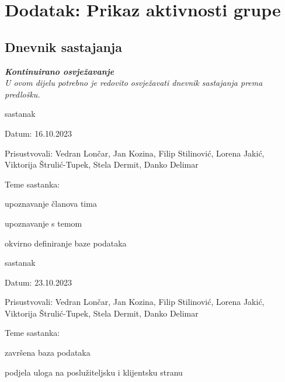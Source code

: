 \chapter*{Dodatak: Prikaz aktivnosti grupe}
		
		\section*{Dnevnik sastajanja}
		
		\textbf{\textit{Kontinuirano osvježavanje}}\\
		
		 \textit{U ovom dijelu potrebno je redovito osvježavati dnevnik sastajanja prema predlošku.}
		
		\begin{packed_enum}
			\item  sastanak
			
			\item[] \begin{packed_item}
				\item Datum: 16.10.2023
				\item Prisustvovali: Vedran Lončar, Jan Kozina, Filip Stilinović, Lorena Jakić, Viktorija Štrulić-Tupek, Stela Dermit, Danko Delimar
				\item Teme sastanka:
				\begin{packed_item}
					\item  upoznavanje članova tima
					\item  upoznavanje s temom
					\item  okvirno definiranje baze podataka
				\end{packed_item}
			\end{packed_item}
			
			\item  sastanak
			\item[] \begin{packed_item}
				\item Datum: 23.10.2023
				\item Prisustvovali: Vedran Lončar, Jan Kozina, Filip Stilinović, Lorena Jakić, Viktorija Štrulić-Tupek, Stela Dermit, Danko Delimar
				\item Teme sastanka:
				\begin{packed_item}
					\item  završena baza podataka
					\item  podjela uloga na poslužiteljsku i klijentsku stranu
				\end{packed_item}
			\end{packed_item}
			

\end{packed_enum}
